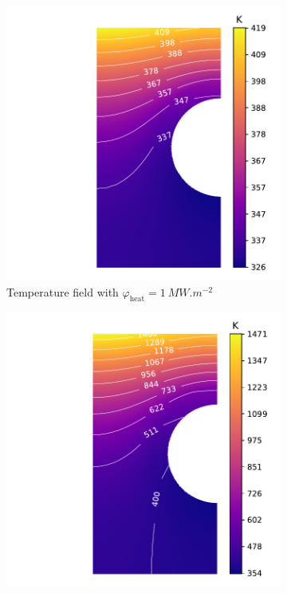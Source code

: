 \begin{figure} [h!]
    \centering
    \begin{subfigure}{0.4\linewidth}
        \centering
        \includegraphics[width=\linewidth]{Figures/Chapter3/monoblocks/parametric_study/T_1e6.pdf}
        \caption{Temperature field with $\varphi_\mathrm{heat} = \SI{1}{MW.m^{-2}}$}
    \end{subfigure}%
    \begin{subfigure}{0.4\linewidth}
        \centering
        \includegraphics[width=\linewidth]{Figures/Chapter3/monoblocks/parametric_study/T_1e7.pdf}

\end{subfigure}
\end{figure}

